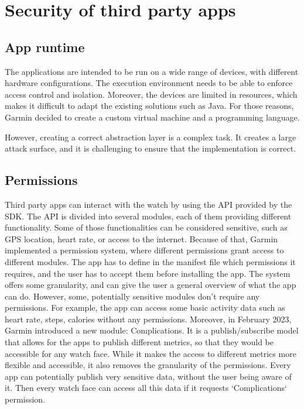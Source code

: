 
\section{Security of third party apps}

\subsection{App runtime}

The applications are intended to be run on a wide range of devices, with different hardware configurations.
The execution environment needs to be able to enforce access control and isolation.
Moreover, the devices are limited in resources, which makes it difficult to adapt the existing solutions such as Java.
For those reasons, Garmin decided to create a custom virtual machine and a programming language.

However, creating a correct abstraction layer is a complex task.
It creates a large attack surface, and it is challenging to ensure that the implementation is correct.

\subsection{Permissions}

Third party apps can interact with the watch by using the API provided by the SDK.
The API is divided into several modules, each of them providing different functionality.
Some of those functionalities can be considered sensitive, such as GPS location, heart rate, or access to the internet.
Because of that, Garmin implemented a permission system, where different permissions grant access to different modules.
The app has to define in the manifest file which permissions it requires, and the user has to accept them before installing the app.
The system offers some granularity, and can give the user a general overview of what the app can do.
However, some, potentially sensitive modules don't require any permissions.
For example, the app can access some basic activity data such as heart rate, steps, calories without any permissions.
Moreover, in February 2023, Garmin introduced a new module: Complications.
It is a publish/subscribe model that allows for the apps to publish different metrics, so that they would be accessible for any watch face.
While it makes the access to different metrics more flexible and accessible, it also removes the granularity of the permissions.
Every app can potentially publish very sensitive data, without the user being aware of it.
Then every watch face can access all this data if it requests `Complications` permission.

